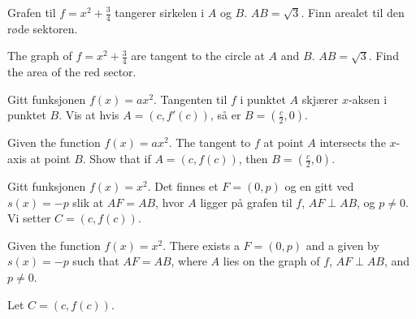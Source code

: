 \documentclass[english,oneside, hidelinks, 11 pt, class=report,crop=false]{standalone}
\begin{document}
\newpage
Grafen til $f=x^2+\frac{3}{4}$ tangerer sirkelen i $A$ og $B$. $AB=\sqrt{3}$. \os 
Finn arealet til den røde sektoren.
 \vsk

The graph of ${f = x^2 + \frac{3}{4}}$ are tangent to the circle at $A$ and $B$. $AB = \sqrt{3}$. \os
Find the area of the red sector.

\newpage
Gitt funksjonen $f(x)=ax^2$. Tangenten til $f$ i punktet $A$ skjærer $x$-aksen i punktet $B$. Vis at hvis $A=(c, f'(c))$, så er $B=\left(\frac{c}{2}, 0\right)$.

Given the function \( f(x) = ax^2 \). The tangent to \( f \) at point \( A \) intersects the \( x \)-axis at point \( B \). Show that if \( A = (c, f(c)) \), then \( B = \left( \frac{c}{2}, 0 \right) \).

\newpage
Gitt funksjonen $f(x)=x^2$. Det finnes et  $F=(0, p)$ og en  gitt ved $s(x)=-p$ slik at $AF=AB$, hvor $A$ ligger på grafen til $f$, $AF\perp AB$, og $p\neq0$.
Vi setter $C=(c, f(c))$.

\newpage
Given the function \( f(x) = x^2 \). There exists a  \( F = (0, p) \) and a  given by \( s(x) = -p \) such that \( AF = AB \), where \( A \) lies on the graph of \( f \), \( AF \perp AB \), and \( p \neq 0 \).


Let \( C = (c, f(c)) \).

\end{document}
